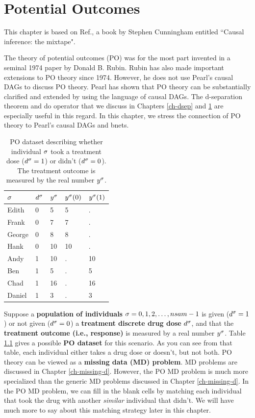 \chapter{Potential Outcomes}
\label{ch-pot-out}
This chapter
is based on Ref.\cite{book-mixtape},
a book by Stephen Cunningham entitled 
``Causal inference: the mixtape".

The theory of potential
outcomes (PO) was for the most part
invented in a seminal
1974 paper by Donald B. Rubin. Rubin
has also
made important extensions
to PO theory since 1974. However, he 
does not
use Pearl's causal DAGs to discuss PO theory. 
Pearl has shown that PO theory
can be substantially clarified
and extended by using
the language of causal DAGs.
The d-separation theorem and do operator
that we discuss in  Chapters \ref{ch-dsep}
and \ref{ch-pot-out}
are especially
useful in this regard.
In this chapter, we stress the
connection
of PO theory to 
Pearl's causal DAGs
and bnets.

\begin{table}[h!]
\centering
\begin{tabular}{|l|l|l|l|l|}
\hline
\rowcolor[HTML]{ECF4FF} 
$\sigma$ & $ d^\sigma$ & $ y^\sigma$ & $ y^\sigma(0)$ & $ y^\sigma(1)$ \\ \hline
Edith & 0 & 5 & 5 & . \\ \hline
Frank & 0 & 7 & 7 & . \\ \hline
George & 0 & 8 & 8 & . \\ \hline
Hank & 0 & 10 & 10 & . \\ \hline
Andy & \cellcolor[HTML]{FFFFC7}1 & 10 & . & 10 \\ \hline
Ben & \cellcolor[HTML]{FFFFC7}1 & 5 & . & 5 \\ \hline
Chad & \cellcolor[HTML]{FFFFC7}1 & 16 & . & 16 \\ \hline
Daniel & \cellcolor[HTML]{FFFFC7}1 & 3 & . & 3 \\ \hline
\end{tabular}
\caption{PO dataset describing whether
individual $\sigma$
took a treatment dose ($d^\sigma=1$)
or didn't ($d^\sigma=0$).
The 
treatment outcome
is measured by the real number $y^\sigma$.}
\label{tab-pot-out-missing}
\end{table} 

Suppose a {\bf population
of individuals} $\sigma=0,1,2, \ldots, nsam-1$
is given ($d^\sigma=1$) or
not given ($d^\sigma=0$)
a {\bf treatment discrete drug dose} $d^\sigma$,
and that
the 
 {\bf treatment outcome (i.e., response)}
is measured by
a real number $y^\sigma$.
Table \ref{tab-pot-out-missing}
gives a possible {\bf PO dataset}
for this scenario.
As you
can see from
that table,
each individual 
either takes a drug
dose or
doesn't,
but not both.
PO theory
can be viewed as a
 {\bf  missing
data (MD) problem}. MD problems are 
discussed in
 Chapter \ref{ch-missing-d}.
However, the PO MD problem 
is much more specialized
than the generic MD problems
discussed in Chapter \ref{ch-missing-d}.
In the PO MD
problem, we can
fill
in the blank cells
by matching
each individual
that took
the drug with
another {\it similar} 
individual that didn't.
We will have much
more to say about
this matching
strategy later in this chapter.


